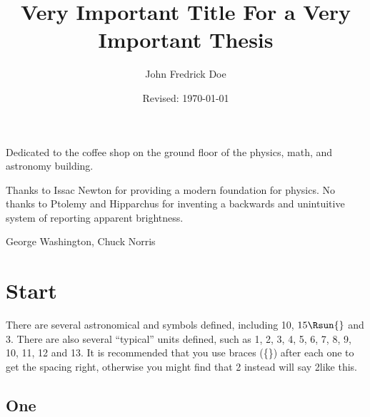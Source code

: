 \documentclass{utthesis}
\begin{document}
\author{John Fredrick Doe} 
\title{Very Important Title For a Very Important Thesis} 
\date{Revised: \today}


\frontmatter

\UTcopyrightlegend %

\begin{UTcommittee}
\end{UTcommittee}


\begin{UTdedication}
Dedicated to the coffee shop on the ground floor of the physics, math, and astronomy building.
\end{UTdedication}

\begin{UTacknowledgements}
Thanks to Issac Newton for providing a modern foundation for physics. No thanks to Ptolemy and Hipparchus for inventing a backwards and unintuitive system of reporting apparent brightness.
\end{UTacknowledgements}

\begin{UTabstract}[S]{George Washington, Chuck Norris}
\lipsum[1]
\end{UTabstract}


\tableofcontents

\listoftables

\listoffigures

\mainmatter

\chapter{Start}
There are several astronomical and symbols defined, including 10\Msun{}, $15\Rsun{}$ and 3\Lsun{}. There are also several ``typical'' units defined, such as 1\km{}, 2\cm{}, 3\Ang{}, 4\gm{}, 5\Sec{}, 6\Day{}, 7\erg{}, 8\eV{}, 9\Kelvin{}, 10\kmSec{}, 11\ergSec{}, 12\cmSec{} and 13\gmSec{}. It is recommended that you use braces (\{\}) after each one to get the spacing right, otherwise you might find that 2\Msun{} instead will say 2\Msun like this. 

\lipsum[3]
\section{One}
\end{document}
